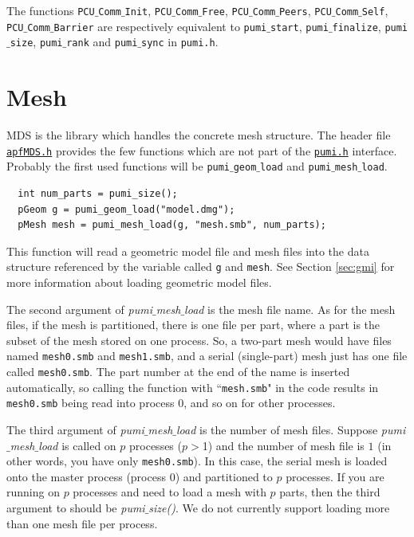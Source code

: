\documentclass{article}
\begin{document}
The functions \texttt{PCU$\_$Comm$\_$Init}, \texttt{PCU$\_$Comm$\_$Free},
\texttt{PCU$\_$Comm$\_$Peers}, \texttt{PCU$\_$Comm$\_$Self}, \texttt{PCU$\_$Comm$\_$Barrier} are respectively
equivalent to \texttt{pumi$\_$start}, \texttt{pumi$\_$finalize},
\texttt{pumi$\_$size}, \texttt{pumi$\_$rank} and \texttt{pumi$\_$sync} in \texttt{pumi.h}.

\section{Mesh}
\label{sec:mds}

MDS is the library which handles the concrete mesh structure.
The header file
\href{https://github.com/SCOREC/core/blob/master/mds/apfMDS.h}{\texttt{apfMDS.h}}
provides the few functions which are not part of the
\href{https://github.com/SCOREC/core/blob/master/pumi/pumi.h}{\texttt{pumi.h}}
interface.
Probably the first used functions will be \texttt{pumi$\_$geom$\_$load} and \texttt{pumi$\_$mesh$\_$load}.

\begin{lstlisting}
  int num_parts = pumi_size();
  pGeom g = pumi_geom_load("model.dmg");
  pMesh mesh = pumi_mesh_load(g, "mesh.smb", num_parts);
\end{lstlisting}

This function will read a geometric model file and mesh files into
the data structure referenced by the variable called \texttt{g} and \texttt{mesh}.
See Section \ref{sec:gmi} for more information about loading
geometric model files. 

The second argument of \emph{pumi$\_$mesh$\_$load} is the mesh file name.
As for the mesh files, if the mesh is partitioned, there is one file per part, where a
part is the subset of the mesh stored on one process.
So, a two-part mesh would have files named \texttt{mesh0.smb}
and \texttt{mesh1.smb}, and a serial (single-part) mesh just has one file
called \texttt{mesh0.smb}.
The part number at the end of the name is inserted automatically,
so calling the function with ``\texttt{mesh.smb}" in the code
results in \texttt{mesh0.smb} being read into process 0, and so
on for other processes.

The third argument of \emph{pumi$\_$mesh$\_$load} is the number of mesh files.
Suppose \emph{pumi$\_$mesh$\_$load} is called on $p$ processes ($p$$>$1) and the number of mesh file is $1$ (in other words, you have only \texttt{mesh0.smb}). In this case, the serial mesh is loaded onto the master process (process $0$) and partitioned to $p$ processes. 
If you are running on $p$ processes and need to load a mesh with $p$ parts, then the third argument to should be \emph{pumi$\_$size()}.
We do not currently support loading more than one mesh file per process.
\end{document}
